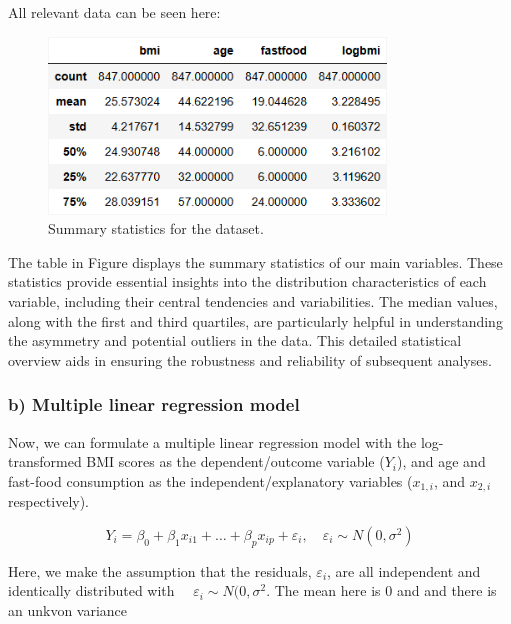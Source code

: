 \documentclass{rapport}
\begin{document}
All relevant data can be seen here:
\begin{figure}[H]
    \centering
    \includegraphics[width=0.8\textwidth]{summary_statistics.png}
    \caption{\small Summary statistics for the dataset.}
    \label{fig:summary_statistics}
\end{figure}

\noindent
The table in Figure displays the summary statistics of our main variables. These statistics provide essential insights into the distribution characteristics of each variable, including their central tendencies and variabilities. The median values, along with the first and third quartiles, are particularly helpful in understanding the asymmetry and potential outliers in the data. This detailed statistical overview aids in ensuring the robustness and reliability of subsequent analyses.





\subsubsection*{\textbf{b)} Multiple linear regression model}
\noindent
Now, we can formulate a multiple linear regression model with the log-transformed BMI scores
\noindent
as the dependent/outcome variable ($Y_i$), and age and fast-food consumption as
\noindent
the independent/explanatory variables ($x_{1,i}$, and $x_{2,i}$ respectively). 

$$
Y_i = \beta_0 + \beta_1x_{i1} + \dots + \beta_px_{ip} + \varepsilon_i, \quad \varepsilon_i \sim N(0, \sigma^2)
$$

\noindent
Here, we make the assumption that the residuals, $\varepsilon_i$, are all independent and identically distributed with 
\noindent
$\quad \varepsilon_i \sim N(0, \sigma^2$. The mean here is 0 and and there is an unkvon variance
\end{document}
